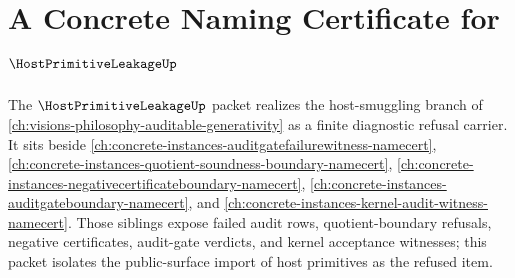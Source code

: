 \chapter{A Concrete Naming Certificate for $\HostPrimitiveLeakageUp$}
\label{ch:concrete-instances-hostprimitiveleakage-namecert}

The $\HostPrimitiveLeakageUp$ packet realizes the host-smuggling branch of \autoref{ch:visions-philosophy-auditable-generativity} as a finite diagnostic refusal carrier. It sits beside \autoref{ch:concrete-instances-auditgatefailurewitness-namecert}, \autoref{ch:concrete-instances-quotient-soundness-boundary-namecert}, \autoref{ch:concrete-instances-negativecertificateboundary-namecert}, \autoref{ch:concrete-instances-auditgateboundary-namecert}, and \autoref{ch:concrete-instances-kernel-audit-witness-namecert}. Those siblings expose failed audit rows, quotient-boundary refusals, negative certificates, audit-gate verdicts, and kernel acceptance witnesses; this packet isolates the public-surface import of host primitives as the refused item.

